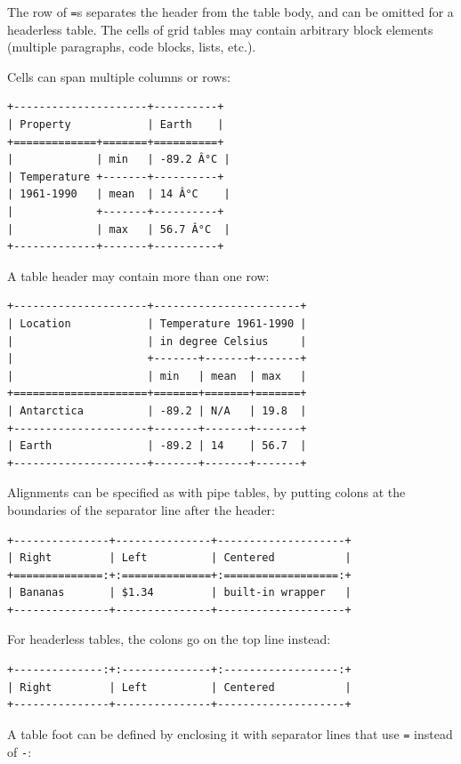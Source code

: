 \documentclass[
]{article}
\begin{document}
The row of \texttt{=}s separates the header from the table body, and can
be omitted for a headerless table. The cells of grid tables may contain
arbitrary block elements (multiple paragraphs, code blocks, lists,
etc.).

Cells can span multiple columns or rows:

\begin{verbatim}
+---------------------+----------+
| Property            | Earth    |
+=============+=======+==========+
|             | min   | -89.2 Â°C |
| Temperature +-------+----------+
| 1961-1990   | mean  | 14 Â°C    |
|             +-------+----------+
|             | max   | 56.7 Â°C  |
+-------------+-------+----------+
\end{verbatim}

A table header may contain more than one row:

\begin{verbatim}
+---------------------+-----------------------+
| Location            | Temperature 1961-1990 |
|                     | in degree Celsius     |
|                     +-------+-------+-------+
|                     | min   | mean  | max   |
+=====================+=======+=======+=======+
| Antarctica          | -89.2 | N/A   | 19.8  |
+---------------------+-------+-------+-------+
| Earth               | -89.2 | 14    | 56.7  |
+---------------------+-------+-------+-------+
\end{verbatim}

Alignments can be specified as with pipe tables, by putting colons at
the boundaries of the separator line after the header:

\begin{verbatim}
+---------------+---------------+--------------------+
| Right         | Left          | Centered           |
+==============:+:==============+:==================:+
| Bananas       | $1.34         | built-in wrapper   |
+---------------+---------------+--------------------+
\end{verbatim}

For headerless tables, the colons go on the top line instead:

\begin{verbatim}
+--------------:+:--------------+:------------------:+
| Right         | Left          | Centered           |
+---------------+---------------+--------------------+
\end{verbatim}

A table foot can be defined by enclosing it with separator lines that
use \texttt{=} instead of \texttt{-}:
\end{document}
